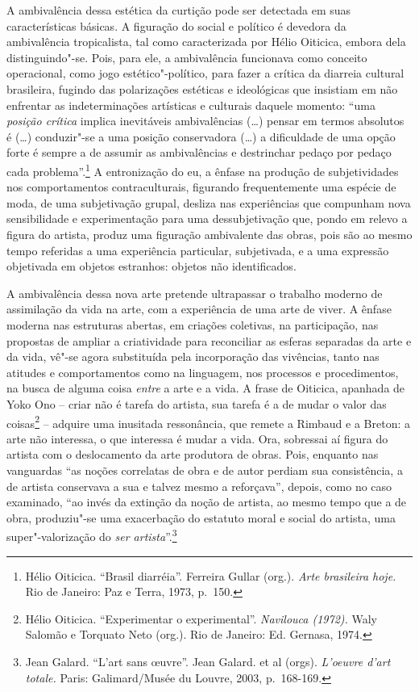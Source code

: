 A ambivalência dessa estética da curtição pode ser detectada em suas
características básicas. A figuração do social e político é devedora da
ambivalência tropicalista, tal como caracterizada por Hélio Oiticica,
embora dela distinguindo"-se. Pois, para ele, a ambivalência funcionava
como conceito operacional, como jogo estético"-político, para fazer a
crítica da diarreia cultural brasileira, fugindo das polarizações
estéticas e ideológicas que insistiam em não enfrentar as
indeterminações artísticas e culturais daquele momento: ``uma
\emph{posição crítica} implica inevitáveis ambivalências (\ldots{}) pensar em
termos absolutos é (\ldots{}) conduzir"-se a uma posição conservadora (\ldots{}) a
dificuldade de uma opção forte é sempre a de assumir as ambivalências e
destrinchar pedaço por pedaço cada problema''.\footnote{Hélio Oiticica.
  ``Brasil diarréia''. Ferreira Gullar (org.). \emph{Arte brasileira
  hoje.} Rio de Janeiro: Paz e Terra, 1973, p.~150.} A entronização do
eu, a ênfase na produção de subjetividades nos comportamentos
contraculturais, figurando frequentemente uma espécie de moda, de uma
subjetivação grupal, desliza nas experiências que compunham nova
sensibilidade e experimentação para uma dessubjetivação que, pondo em
relevo a figura do artista, produz uma figuração ambivalente das obras,
pois são ao mesmo tempo referidas a uma experiência particular,
subjetivada, e a uma expressão objetivada em objetos estranhos: objetos
não identificados.

A ambivalência dessa nova arte pretende ultrapassar o trabalho moderno
de assimilação da vida na arte, com a experiência de uma arte de viver.
A ênfase moderna nas estruturas abertas, em criações coletivas, na
participação, nas propostas de ampliar a criatividade para reconciliar
as esferas separadas da arte e da vida, vê"-se agora substituída pela
incorporação das vivências, tanto nas atitudes e comportamentos como na
linguagem, nos processos e procedimentos, na busca de alguma coisa
\emph{entre} a arte e a vida. A frase de Oiticica, apanhada de Yoko Ono
-- criar não é tarefa do artista, sua tarefa é a de mudar o valor das
coisas\footnote{Hélio Oiticica. ``Experimentar o experimental''.
  \emph{Navilouca (1972).} Waly Salomão e Torquato Neto (org.). Rio de
  Janeiro: Ed. Gernasa, 1974.} -- adquire uma inusitada ressonância, que
remete a Rimbaud e a Breton: a arte não interessa, o que interessa é
mudar a vida. Ora, sobressai aí figura do artista com o deslocamento da
arte produtora de obras. Pois, enquanto nas vanguardas ``as noções
correlatas de obra e de autor perdiam sua consistência, a de artista
conservava a sua e talvez mesmo a reforçava'', depois, como no caso
examinado, ``ao invés da extinção da noção de artista, ao mesmo tempo
que a de obra, produziu"-se uma exacerbação do estatuto moral e social do
artista, uma super"-valorização do \emph{ser artista}''.\footnote{Jean
  Galard. ``L'art sans \oe uvre''. Jean Galard. et al (orgs).
  \emph{L'oeuvre d'art totale.} Paris: Galimard/Musée du Louvre, 2003,
  p.~168-169.}


